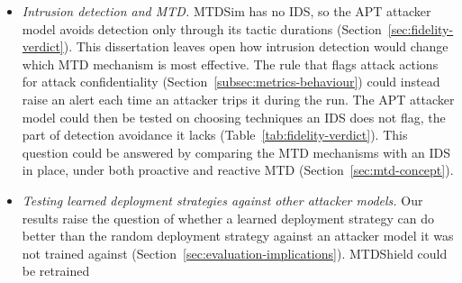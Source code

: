 \documentclass{cshonours}
\begin{document}
\begin{itemize}
  \item \emph{Intrusion detection and MTD.} MTDSim has no IDS, so the APT
  attacker model avoids detection only through its tactic durations
  (Section~\ref{sec:fidelity-verdict}). This dissertation leaves open how
  intrusion detection would change which MTD mechanism is most effective. The
  rule that flags attack actions for attack confidentiality
  (Section~\ref{subsec:metrics-behaviour}) could instead raise an alert each
  time an attacker trips it during the run. The APT attacker model could then
  be tested on choosing techniques an IDS does not flag, the part of detection
  avoidance it lacks (Table~\ref{tab:fidelity-verdict}). This question could be
  answered by comparing the MTD mechanisms with an IDS in place, under both
  proactive and reactive MTD (Section~\ref{sec:mtd-concept}).
  \item \emph{Testing learned deployment strategies against other attacker
  models.} Our results raise the question of whether a learned deployment
  strategy can do better than the random deployment strategy against an
  attacker model it was not trained against
  (Section~\ref{sec:evaluation-implications}). MTDShield could be retrained

\end{itemize}
\end{document}
